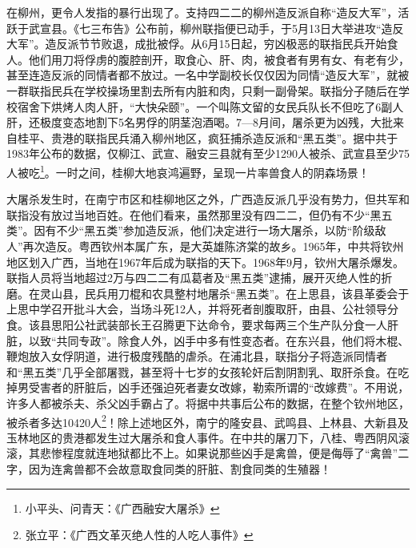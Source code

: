 在柳州，更令人发指的暴行出现了。支持四二二的柳州造反派自称“造反大军”，活跃于武宣县。《七三布告》公布前，柳州联指便已动手，于5月13日大举进攻“造反大军”。造反派节节败退，成批被俘。从6月15日起，穷凶极恶的联指民兵开始食人。他们用刀将俘虏的腹腔剖开，取食心、肝、肉，被食者有男有女、有老有少，甚至连造反派的同情者都不放过。一名中学副校长仅仅因为同情“造反大军”，就被一群联指民兵在学校操场里割去所有内脏和肉，只剩一副骨架。联指分子随后在学校宿舍下烘烤人肉人肝，“大快朵颐”。一个叫陈文留的女民兵队长不但吃了6副人肝，还极度变态地割下5名男俘的阴茎泡酒喝。7—8月间，屠杀更为凶残，大批来自桂平、贵港的联指民兵涌入柳州地区，疯狂捕杀造反派和“黑五类”。据中共于1983年公布的数据，仅柳江、武宣、融安三县就有至少1290人被杀、武宣县至少75人被吃\footnote{小平头、问青天：《广西融安大屠杀》}。一时之间，桂柳大地哀鸿遍野，呈现一片率兽食人的阴森场景！

大屠杀发生时，在南宁市区和桂柳地区之外，广西造反派几乎没有势力，但共军和联指没有放过当地百姓。在他们看来，虽然那里没有四二二，但仍有不少“黑五类”。因有不少“黑五类”参加造反派，他们决定进行一场大屠杀，以防“阶级敌人”再次造反。粤西钦州本属广东，是大英雄陈济棠的故乡。1965年，中共将钦州地区划入广西，当地在1967年后成为联指的天下。1968年9月，钦州大屠杀爆发。联指人员将当地超过2万与四二二有瓜葛者及“黑五类”逮捕，展开灭绝人性的折磨。在灵山县，民兵用刀棍和农具整村地屠杀“黑五类”。在上思县，该县革委会于上思中学召开批斗大会，当场斗死12人，并将死者剖腹取肝，由县、公社领导分食。该县思阳公社武装部长王召腾更下达命令，要求每两三个生产队分食一人肝脏，以致“共同专政”。除食人外，凶手中多有性变态者。在东兴县，他们将木棍、鞭炮放入女俘阴道，进行极度残酷的虐杀。在浦北县，联指分子将造派同情者和“黑五类”几乎全部屠戮，甚至将十七岁的女孩轮奸后割阴割乳、取肝杀食。在吃掉男受害者的肝脏后，凶手还强迫死者妻女改嫁，勒索所谓的“改嫁费”。不用说，许多人都被杀夫、杀父凶手霸占了。将据中共事后公布的数据，在整个钦州地区，被杀者多达10420人\footnote{张立平：《广西文革灭绝人性的人吃人事件》}！除上述地区外，南宁的隆安县、武鸣县、上林县、大新县及玉林地区的贵港都发生过大屠杀和食人事件。在中共的屠刀下，八桂、粤西阴风滚滚，其悲惨程度就连地狱都比不上。如果说那些凶手是禽兽，便是侮辱了“禽兽”二字，因为连禽兽都不会故意取食同类的肝脏、割食同类的生殖器！

